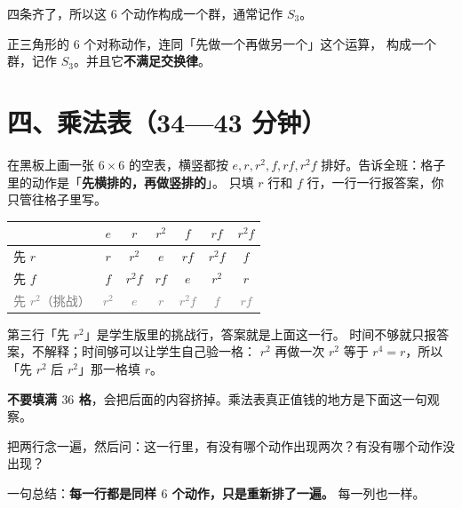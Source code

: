 四条齐了，所以这 \(6\) 个动作构成一个群，通常记作 \(S_3\)。

\begin{dingli}[三角形动作群]
  正三角形的 \(6\) 个对称动作，连同「先做一个再做另一个」这个运算，
  构成一个群，记作 \(S_3\)。并且它\textbf{不满足交换律}。
\end{dingli}

\section*{四、乘法表（34—43 分钟）}

\begin{caozuo}
  在黑板上画一张 \(6\times6\) 的空表，横竖都按
  \(e,r,r^2,f,rf,r^2f\) 排好。告诉全班：格子里的动作是「\textbf{先横排的，再做竖排的}」。
  只填 \(r\) 行和 \(f\) 行，一行一行报答案，你只管往格子里写。
\end{caozuo}

\begin{center}
\begin{tabular}{@{}l|cccccc@{}}
  \toprule
   & \(e\) & \(r\) & \(r^2\) & \(f\) & \(rf\) & \(r^2f\) \\
  \midrule
  先 \(r\) & \(r\) & \(r^2\) & \(e\) & \(rf\) & \(r^2f\) & \(f\) \\
  先 \(f\) & \(f\) & \(r^2f\) & \(rf\) & \(e\) & \(r^2\) & \(r\) \\
  \midrule
  \textcolor{gray}{先 \(r^2\)（挑战）} & \textcolor{gray}{\(r^2\)} & \textcolor{gray}{\(e\)} & \textcolor{gray}{\(r\)} & \textcolor{gray}{\(r^2f\)} & \textcolor{gray}{\(f\)} & \textcolor{gray}{\(rf\)} \\
  \bottomrule
\end{tabular}
\end{center}

\begin{zhu}
  第三行「先 \(r^2\)」是学生版里的挑战行，答案就是上面这一行。
  时间不够就只报答案，不解释；时间够可以让学生自己验一格：
  \(r^2\) 再做一次 \(r^2\) 等于 \(r^4=r\)，所以「先 \(r^2\) 后 \(r^2\)」那一格填 \(r\)。
\end{zhu}

\begin{zhu}
  \textbf{不要填满 \(36\) 格}，会把后面的内容挤掉。乘法表真正值钱的地方是下面这一句观察。
\end{zhu}

把两行念一遍，然后问：这一行里，有没有哪个动作出现两次？有没有哪个动作没出现？

一句总结：\textbf{每一行都是同样 \(6\) 个动作，只是重新排了一遍。} 每一列也一样。

